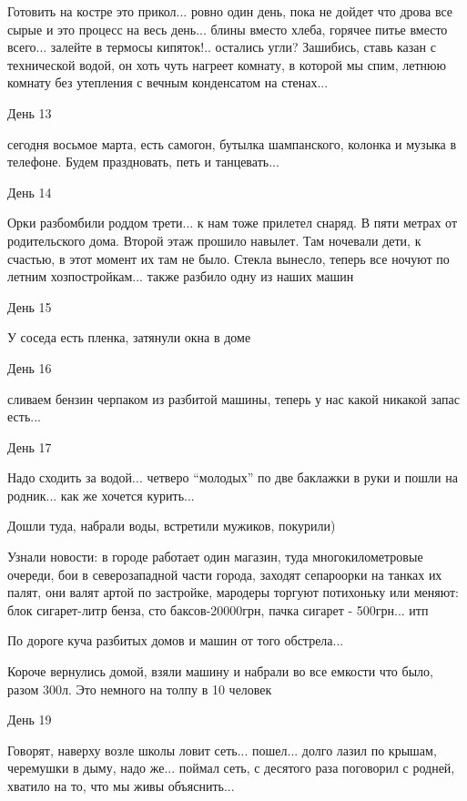 Готовить на костре это прикол... ровно один день, пока не дойдет что дрова все
сырые и это процесс на весь день... блины вместо хлеба, горячее питье вместо
всего... залейте в термосы кипяток!.. остались угли? Зашибись, ставь казан с
технической водой, он хоть чуть нагреет комнату, в которой мы спим, летнюю
комнату без утепления с вечным конденсатом на стенах...

День 13 

сегодня восьмое марта, есть самогон, бутылка шампанского, колонка и музыка в
телефоне. Будем праздновать, петь и танцевать...

День 14

Орки разбомбили роддом трети... к нам тоже прилетел снаряд. В пяти метрах от
родительского дома. Второй этаж прошило навылет. Там ночевали дети, к счастью,
в этот момент их там не было. Стекла вынесло, теперь все ночуют по летним
хозпостройкам... также разбило одну из наших машин


День 15 

У соседа есть пленка, затянули окна в доме

День 16 

сливаем бензин черпаком из разбитой машины, теперь у нас какой никакой запас есть...

День 17

Надо сходить за водой... четверо \enquote{молодых} по две баклажки в руки и
пошли на родник... как же хочется курить...

Дошли туда, набрали воды, встретили мужиков, покурили)

Узнали новости: в городе работает один магазин, туда многокилометровые очереди,
бои в северозападной части города, заходят сепароорки на танках их палят, они
валят артой по застройке, мародеры торгуют потихоньку или меняют: блок
сигарет-литр бенза, сто баксов-20000грн, пачка сигарет - 500грн... итп

По дороге куча разбитых домов и машин от того обстрела...

Короче вернулись домой, взяли машину и набрали во все емкости что было, разом
300л. Это немного на толпу в 10 человек

День 19

Говорят, наверху возле школы ловит сеть... пошел... долго лазил по крышам,
черемушки в дыму, надо же... поймал сеть, с десятого раза поговорил с родней,
хватило на то, что мы живы объяснить...

